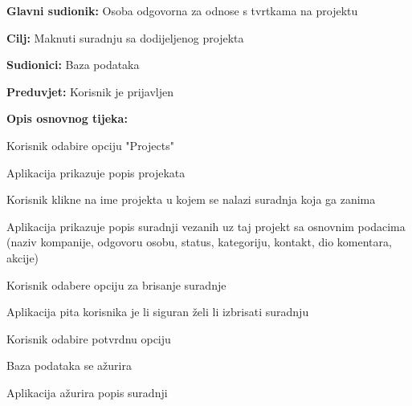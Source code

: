 					\noindent {}
					\begin{packed_item}

						\item \textbf{Glavni sudionik:} Osoba odgovorna za odnose s tvrtkama na projektu
						\item \textbf{Cilj:} Maknuti suradnju sa dodijeljenog projekta
						\item \textbf{Sudionici:} Baza podataka
						\item \textbf{Preduvjet:} Korisnik je prijavljen
						\item \textbf{Opis osnovnog tijeka:}

						\item[] \begin{packed_enum}

							\item Korisnik odabire opciju "Projects"
							\item Aplikacija prikazuje popis projekata
							\item Korisnik klikne na ime projekta u kojem se nalazi suradnja koja ga zanima
							\item Aplikacija prikazuje popis suradnji vezanih uz taj projekt sa osnovnim podacima (naziv kompanije, odgovoru osobu, status, kategoriju, kontakt, dio komentara, akcije)
                            \item Korisnik odabere opciju za brisanje suradnje
                            \item Aplikacija pita korisnika je li siguran želi li izbrisati suradnju
                            \item Korisnik odabire potvrdnu opciju
                            \item Baza podataka se ažurira
                            \item Aplikacija ažurira popis suradnji
                            
						\end{packed_enum}
					\end{packed_item}

